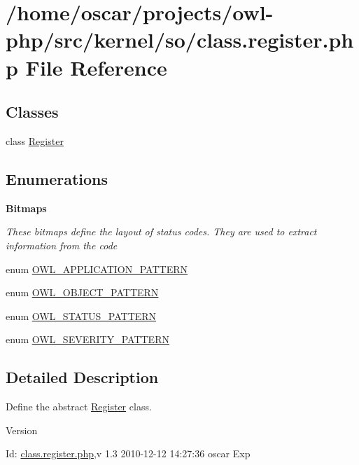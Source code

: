 \section{/home/oscar/projects/owl-\/php/src/kernel/so/class.register.php File Reference}
\label{class_8register_8php}
\subsection*{Classes}
\begin{DoxyCompactItemize}
\item 
class \hyperlink{classRegister}{Register}
\end{DoxyCompactItemize}
\subsection*{Enumerations}
\begin{Indent}{\bf Bitmaps}\par
{\em \label{_amgrp2ec9eef022a1b519bdb1040e05224b00}
 These bitmaps define the layout of status codes. They are used to extract information from the code }\begin{DoxyCompactItemize}
\item 
enum \hyperlink{class_8register_8php_a22359c406b8745e8fa2412ec96d5e74c}{OWL\_\-APPLICATION\_\-PATTERN} 
\item 
enum \hyperlink{class_8register_8php_aac5ed52fb1bbffdff69e9a24c40962f5}{OWL\_\-OBJECT\_\-PATTERN} 
\item 
enum \hyperlink{class_8register_8php_a0a8649e9ad7fa654df2c41aa4ba1283c}{OWL\_\-STATUS\_\-PATTERN} 
\item 
enum \hyperlink{class_8register_8php_aeb9363fcaa1cd911762ff88518a9d973}{OWL\_\-SEVERITY\_\-PATTERN} 
\end{DoxyCompactItemize}
\end{Indent}


\subsection{Detailed Description}
Define the abstract \hyperlink{classRegister}{Register} class. \begin{DoxyVersion}{Version}

\end{DoxyVersion}
\begin{DoxyParagraph}{Id:}
\hyperlink{class_8register_8php}{class.register.php},v 1.3 2010-\/12-\/12 14:27:36 oscar Exp 
\end{DoxyParagraph}


